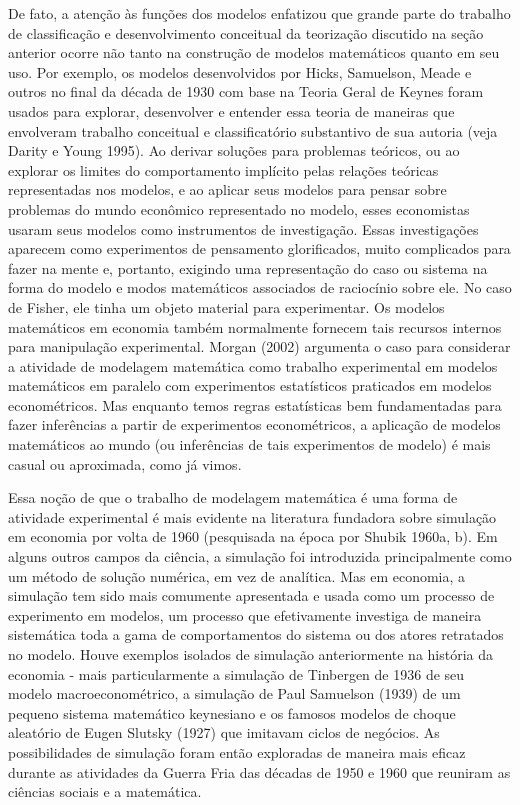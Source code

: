\documentclass[a4paper,12pt]{article}[abntex2]
\begin{document}
De fato, a atenção às funções dos modelos enfatizou que grande parte do trabalho de classificação e desenvolvimento conceitual da teorização discutido na seção anterior ocorre não tanto na construção de modelos matemáticos quanto em seu uso. Por exemplo, os modelos desenvolvidos por Hicks, Samuelson, Meade e outros no final da década de 1930 com base na Teoria Geral de Keynes foram usados para explorar, desenvolver e entender essa teoria de maneiras que envolveram trabalho conceitual e classificatório substantivo de sua autoria (veja Darity e Young 1995). Ao derivar soluções para problemas teóricos, ou ao explorar os limites do comportamento implícito pelas relações teóricas representadas nos modelos, e ao aplicar seus modelos para pensar sobre problemas do mundo econômico representado no modelo, esses economistas usaram seus modelos como instrumentos de investigação. Essas investigações aparecem como experimentos de pensamento glorificados, muito complicados para fazer na mente e, portanto, exigindo uma representação do caso ou sistema na forma do modelo e modos matemáticos associados de raciocínio sobre ele. No caso de Fisher, ele tinha um objeto material para experimentar. Os modelos matemáticos em economia também normalmente fornecem tais recursos internos para manipulação experimental. Morgan (2002) argumenta o caso para considerar a atividade de modelagem matemática como trabalho experimental em modelos matemáticos em paralelo com experimentos estatísticos praticados em modelos econométricos. Mas enquanto temos regras estatísticas bem fundamentadas para fazer inferências a partir de experimentos econométricos, a aplicação de modelos matemáticos ao mundo (ou inferências de tais experimentos de modelo) é mais casual ou aproximada, como já vimos.

Essa noção de que o trabalho de modelagem matemática é uma forma de atividade experimental é mais evidente na literatura fundadora sobre simulação em economia por volta de 1960 (pesquisada na época por Shubik 1960a, b). Em alguns outros campos da ciência, a simulação foi introduzida principalmente como um método de solução numérica, em vez de analítica. Mas em economia, a simulação tem sido mais comumente apresentada e usada como um processo de experimento em modelos, um processo que efetivamente investiga de maneira sistemática toda a gama de comportamentos do sistema ou dos atores retratados no modelo. Houve exemplos isolados de simulação anteriormente na história da economia - mais particularmente a simulação de Tinbergen de 1936 de seu modelo macroeconométrico, a simulação de Paul Samuelson (1939) de um pequeno sistema matemático keynesiano e os famosos modelos de choque aleatório de Eugen Slutsky (1927) que imitavam ciclos de negócios. As possibilidades de simulação foram então exploradas de maneira mais eficaz durante as atividades da Guerra Fria das décadas de 1950 e 1960 que reuniram as ciências sociais e a matemática.
\end{document}
